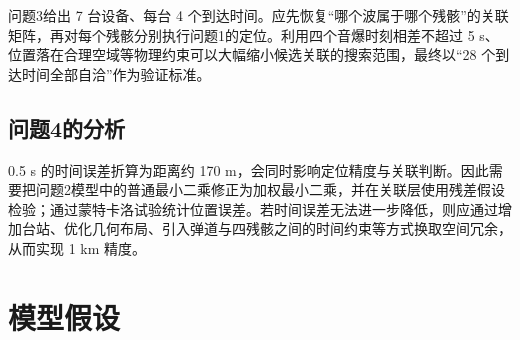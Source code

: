 \documentclass[12pt,a4paper]{article}
\newcommand{\tip}[1]{\par\noindent\textbf{【提示】} #1\par}
\begin{document}
问题3给出 7 台设备、每台 4 个到达时间。应先恢复“哪个波属于哪个残骸”的关联矩阵，再对每个残骸分别执行问题1的定位。利用四个音爆时刻相差不超过 5 s、位置落在合理空域等物理约束可以大幅缩小候选关联的搜索范围，最终以“28 个到达时间全部自洽”作为验证标准。

\subsection{问题4的分析}

0.5 s 的时间误差折算为距离约 170 m，会同时影响定位精度与关联判断。因此需要把问题2模型中的普通最小二乘修正为加权最小二乘，并在关联层使用残差假设检验；通过蒙特卡洛试验统计位置误差。若时间误差无法进一步降低，则应通过增加台站、优化几何布局、引入弹道与四残骸之间的时间约束等方式换取空间冗余，从而实现 1 km 精度。

\section{模型假设}


\end{document}
